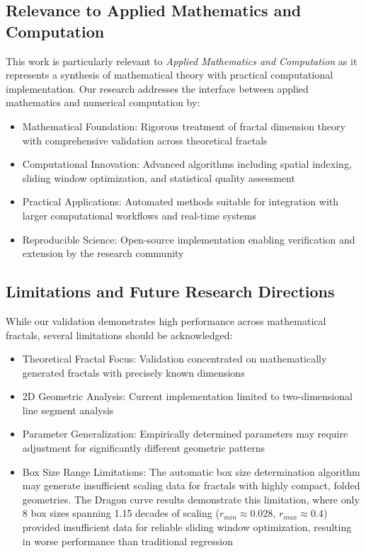\documentclass[preprint,12pt]{elsarticle}
\def\textbf#1{#1}%
\begin{document}
\subsection{Relevance to Applied Mathematics and Computation}

This work is particularly relevant to \emph{Applied Mathematics and Computation} as it represents a synthesis of mathematical theory with practical computational implementation. Our research addresses the interface between applied mathematics and numerical computation by:

\begin{itemize}
\item \textbf{Mathematical Foundation}: Rigorous treatment of fractal dimension theory with comprehensive validation across theoretical fractals
\item \textbf{Computational Innovation}: Advanced algorithms including spatial indexing, sliding window optimization, and statistical quality assessment
\item \textbf{Practical Applications}: Automated methods suitable for integration with larger computational workflows and real-time systems
\item \textbf{Reproducible Science}: Open-source implementation enabling verification and extension by the research community
\end{itemize}

\subsection{Limitations and Future Research Directions}

While our validation demonstrates high performance across mathematical fractals, several limitations should be acknowledged:

\begin{itemize}
\item \textbf{Theoretical Fractal Focus}: Validation concentrated on mathematically generated fractals with precisely known dimensions
\item \textbf{2D Geometric Analysis}: Current implementation limited to two-dimensional line segment analysis
\item \textbf{Parameter Generalization}: Empirically determined parameters may require adjustment for significantly different geometric patterns
\item \textbf{Box Size Range Limitations}: The automatic box size determination algorithm may generate insufficient scaling data for fractals with highly compact, folded geometries. The Dragon curve results demonstrate this limitation, where only 8 box sizes spanning 1.15 decades of scaling ($r_{min} \approx 0.028$, $r_{max} \approx 0.4$) provided insufficient data for reliable sliding window optimization, resulting in worse performance than traditional regression
\end{itemize}
\end{document}
